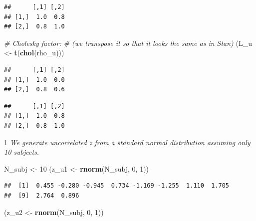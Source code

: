 \documentclass[12pt,]{krantz}
\newenvironment{Shaded}{\begin{snugshade}}{\end{snugshade}}
\newcommand{\KeywordTok}[1]{\textcolor[rgb]{0.13,0.29,0.53}{\textbf{#1}}}
\newcommand{\DecValTok}[1]{\textcolor[rgb]{0.00,0.00,0.81}{#1}}
\newcommand{\StringTok}[1]{\textcolor[rgb]{0.31,0.60,0.02}{#1}}
\newcommand{\CommentTok}[1]{\textcolor[rgb]{0.56,0.35,0.01}{\textit{#1}}}
\newcommand{\OperatorTok}[1]{\textcolor[rgb]{0.81,0.36,0.00}{\textbf{#1}}}
\newcommand{\NormalTok}[1]{#1}
\theoremstyle{definition}
\theoremstyle{definition}
\theoremstyle{definition}
\theoremstyle{remark}
\begin{document}
\begin{verbatim}
##      [,1] [,2]
## [1,]  1.0  0.8
## [2,]  0.8  1.0
\end{verbatim}

\begin{Shaded}
\begin{Highlighting}[]
\CommentTok{# Cholesky factor:}
\CommentTok{# (we transpose it so that it looks the same as in Stan)}
\NormalTok{(L_u <-}\StringTok{ }\KeywordTok{t}\NormalTok{(}\KeywordTok{chol}\NormalTok{(rho_u))) }
\end{Highlighting}
\end{Shaded}

\begin{verbatim}
##      [,1] [,2]
## [1,]  1.0  0.0
## [2,]  0.8  0.6
\end{verbatim}

\begin{Shaded}
\end{Shaded}

\begin{verbatim}
##      [,1] [,2]
## [1,]  1.0  0.8
## [2,]  0.8  1.0
\end{verbatim}

1 \emph{We generate uncorrelated z from a standard normal distribution
assuming only 10 subjects.}

\begin{Shaded}
\begin{Highlighting}[]
\NormalTok{ N_subj <-}\StringTok{ }\DecValTok{10}
\NormalTok{ (z_u1 <-}\StringTok{ }\KeywordTok{rnorm}\NormalTok{(N_subj, }\DecValTok{0}\NormalTok{, }\DecValTok{1}\NormalTok{))}
\end{Highlighting}
\end{Shaded}

\begin{verbatim}
##  [1]  0.455 -0.280 -0.945  0.734 -1.169 -1.255  1.110  1.705
##  [9]  2.764  0.896
\end{verbatim}

\begin{Shaded}
\begin{Highlighting}[]
\NormalTok{ (z_u2 <-}\StringTok{ }\KeywordTok{rnorm}\NormalTok{(N_subj, }\DecValTok{0}\NormalTok{, }\DecValTok{1}\NormalTok{))}
\end{Highlighting}
\end{Shaded}
\end{document}

